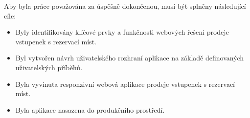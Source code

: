Aby byla práce považována za úspěšně dokončenou, musí být splněny následující cíle:

\begin{itemize}
    \item Byly identifikovány klíčové prvky a funkčnosti webových řešení prodeje vstupenek s rezervací míst.
    \item Byl vytvořen návrh uživatelského rozhraní aplikace na základě definovaných uživatelských příběhů.
    \item Byla vyvinuta responzivní webová aplikace prodeje vstupenek s rezervací míst.
    \item Byla aplikace nasazena do produkčního prostředí.
\end{itemize}
